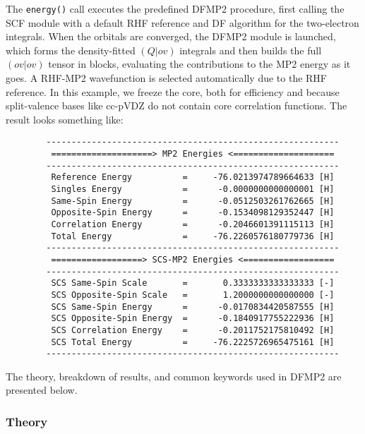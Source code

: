 The \texttt{energy()} call executes the predefined DFMP2 procedure, first calling
the SCF module with a default RHF reference and DF algorithm for the
two-electron integrals. When the orbitals are converged, the DFMP2 module is
launched, which forms the density-fitted $(Q|ov)$ integrals and then builds the
full $(ov|ov)$ tensor in blocks, evaluating the contributions to the MP2 energy
as it goes. A RHF-MP2 wavefunction is selected automatically due to the RHF
reference. In this example, we freeze the core, both for efficiency and
because split-valence bases like cc-pVDZ do not contain core correlation
functions. The result looks something like:
\begin{verbatim}
        ----------------------------------------------------------
         ====================> MP2 Energies <====================
        ----------------------------------------------------------
         Reference Energy          =     -76.0213974789664633 [H]
         Singles Energy            =      -0.0000000000000001 [H]
         Same-Spin Energy          =      -0.0512503261762665 [H]
         Opposite-Spin Energy      =      -0.1534098129352447 [H]
         Correlation Energy        =      -0.2046601391115113 [H]
         Total Energy              =     -76.2260576180779736 [H]
        ----------------------------------------------------------
         ==================> SCS-MP2 Energies <==================
        ----------------------------------------------------------
         SCS Same-Spin Scale       =       0.3333333333333333 [-]
         SCS Opposite-Spin Scale   =       1.2000000000000000 [-]
         SCS Same-Spin Energy      =      -0.0170834420587555 [H]
         SCS Opposite-Spin Energy  =      -0.1840917755222936 [H]
         SCS Correlation Energy    =      -0.2011752175810492 [H]
         SCS Total Energy          =     -76.2225726965475161 [H]
        ----------------------------------------------------------
\end{verbatim}
The theory, breakdown of results, and common keywords used in DFMP2 are presented below. 

\subsubsection{Theory}

